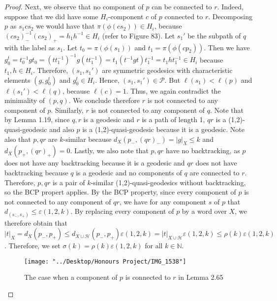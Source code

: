 \documentclass[12pt]{article}
\begin{document}
\begin{proof}
		Next, we observe that no component of $p$ can be connected to $r$. Indeed, suppose that we did have some $H_i$-component $c$ of $p$ connected to $r$. Decomposing $p$ as $s_1 c s_2$ we would have that $\pi(\phi(c s_2)) \in H_i$, because $(c s_2)_{-}^{-1}(c s_2)_{+} = h_1 h^{-1} \in H_i$ (refer to Figure 83). Let $s_1'$ be the subpath of $q$ with the label as $s_1$. Let $t_0 = \pi(\phi(s_1))$ and $t_1 = \pi(\phi(c p_2))$. Then we have $g^t_0 = t_0^{-1} g t_0 = (t t_1^{-1})^{-1} g (t t_1^{-1})= t_1  (t^{-1} g t) t_1^{-1} = t_1 h t_1^{-1} \in H_i$ because $t_1, h \in H_i$. Therefore, $(s_1,s_1')$ are symmetric geodesics with characteristic elements $(g, g^t_0)$ and $g^t_0 \in H_i$. Hence, $(s_1, s_1') \in \mathcal{P}$. But $\ell(s_1) < \ell(p)$ and $\ell(s_1') < \ell(q)$, because $\ell(c) = 1$. Thus, we again contradict the minimality of $(p,q)$. We conclude therefore $r$ is not connected to any component of $p$. Similarly, $r$ is not connected to any component of $q$. Note that by Lemma 1.19, since $q,r$ is a geodesic and $r$ is a path of length 1, $qr$ is a (1,2)-quasi-geodesic and also $p$ is a (1,2)-quasi-geodesic because it is a geodesic. Note also that $p, qr$ are $k$-similar because $d_X(p_{-}, (qr)_{-}) = \vert g \vert_X \leq k$ and $d_X(p_{+}, (qr)_{+}) = 0$. Lastly, we also note that $p,qr$ have no backtracking, as $p$ does not have any backtracking because it is a geodesic and $qr$ does not have backtracking because $q$ is a geodesic and no components of $q$ are connected to $r$. Therefore, $p, qr$ is a pair of $k$-similar (1,2)-quasi-geodesics without backtracking, so the BCP propert applies. By the BCP property, since every component of $p$ is not connected to any component of $qr$, we have for any component $s$ of $p$ that $d_(s_{-}, s_{+}) \leq \varepsilon(1,2,k)$. By replacing every component of $p$ by a word over $X$, we therefore obtain that $\vert t \vert_X = d_X(p_{-}, p_{+}) \leq d_{X \cup \mathcal{H}}(p_{-}, p_{+}) \varepsilon(1,2,k) = \vert t \vert_{X \cup \mathcal{H}} \varepsilon(1,2,k) \leq \rho(k) \varepsilon(1,2,k)$. Therefore, we set $\sigma(k) = \rho(k) \varepsilon(1,2,k)$ for all $k \in \mathbb{N}$.
		
\begin{figure} [H]
	\centering
	\texttt{[image: "../Desktop/Honours Project/IMG\_1538"]}
	\caption{The case when a component of $p$ is connected to $r$ in Lemma 2.65}
	\label{fig:img1538}
\end{figure}
		
	\end{proof}
\end{document}
